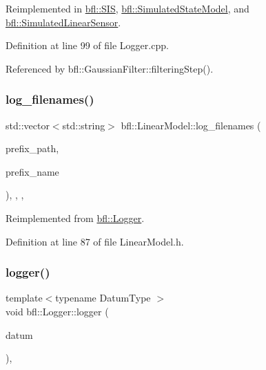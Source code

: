 Reimplemented in \mbox{\hyperlink{classbfl_1_1SIS_aeb0b87af1cc1fc4b616989ef489ecccc}{bfl\+::\+S\+IS}}, \mbox{\hyperlink{classbfl_1_1SimulatedStateModel_aa022eb0d50d898ffcc831af2907265b2}{bfl\+::\+Simulated\+State\+Model}}, and \mbox{\hyperlink{classbfl_1_1SimulatedLinearSensor_ab75bbe744d8516c97dfc90ad499b10e6}{bfl\+::\+Simulated\+Linear\+Sensor}}.



Definition at line 99 of file Logger.\+cpp.



Referenced by bfl\+::\+Gaussian\+Filter\+::filtering\+Step().

\mbox{\label{classbfl_1_1LinearModel_a8b8f645a7b7d8ebbb02c8958428fcf10}} 
\subsubsection{\texorpdfstring{log\+\_\+filenames()}{log\_filenames()}}
{\footnotesize\ttfamily std\+::vector$<$std\+::string$>$ bfl\+::\+Linear\+Model\+::log\+\_\+filenames (\begin{DoxyParamCaption}\item[{const std\+::string \&}]{prefix\+\_\+path,  }\item[{const std\+::string \&}]{prefix\+\_\+name }\end{DoxyParamCaption})\hspace{0.3cm}{\ttfamily [inline]}, {\ttfamily [override]}, {\ttfamily [protected]}, {\ttfamily [virtual]}}



Reimplemented from \mbox{\hyperlink{classbfl_1_1Logger_a328ceaa8e70e6918f11142b12b8be217}{bfl\+::\+Logger}}.



Definition at line 87 of file Linear\+Model.\+h.

\mbox{\label{classbfl_1_1Logger_a1033ff31398484f2132f84fd140da9e3}} 
\subsubsection{\texorpdfstring{logger()}{logger()}\hspace{0.1cm}{\footnotesize\ttfamily [1/4]}}
{\footnotesize\ttfamily template$<$typename Datum\+Type $>$ \\
void bfl\+::\+Logger\+::logger (\begin{DoxyParamCaption}\item[{Datum\+Type}]{datum }\end{DoxyParamCaption})\hspace{0.3cm}{\ttfamily [inline]}, {\ttfamily [inherited]}}




